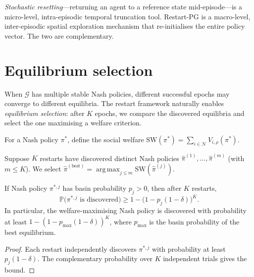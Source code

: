 \documentclass[a4paper,oneside,11pt]{report}
\newcommand{\Prob}{\mathbb{P}}
\newcommand{\calN}{\mathcal{N}}
\newcommand{\calG}{\mathcal{G}}
\DeclareMathOperator*{\argmax}{arg\,max}
\numberwithin{theorem}{chapter}
\numberwithin{equation}{chapter}
\begin{document}
\begin{remark}
  \label{rem:resetting}
  \emph{Stochastic resetting}---returning an agent to a reference state
  mid-episode---is a micro-level, intra-episodic temporal truncation
  tool. Restart-PG is a macro-level, inter-episodic spatial exploration
  mechanism that re-initialises the entire policy vector. The two are
  complementary.
\end{remark}

\section{Equilibrium selection}
\label{sec:eq-selection}

When $\calG$ has multiple stable Nash policies, different successful
epochs may converge to different equilibria. The restart framework
naturally enables \emph{equilibrium selection}: after $K$ epochs, we
compare the discovered equilibria and select the one maximising a
welfare criterion.

\begin{definition}
  For a Nash policy $\pi^*$, define the social welfare
  $\mathrm{SW}(\pi^*) = \sum_{i \in \calN} V_{i,\rho}(\pi^*)$.
\end{definition}

Suppose $K$ restarts have discovered distinct Nash policies
$\hat\pi^{(1)}, \ldots, \hat\pi^{(m)}$ (with $m \le K$). We select
$\hat\pi^{(\text{best})} = \argmax_{j \le m} \mathrm{SW}(\hat\pi^{(j)})$.

\begin{proposition}
  \label{prop:discovery}
  If Nash policy $\pi^{*,j}$ has basin probability $p_j > 0$, then after
  $K$ restarts,
  \begin{equation}
    \Prob\bigl(\pi^{*,j} \text{ is discovered}\bigr)
    \ge 1 - \bigl(1 - p_j(1-\delta)\bigr)^K.
  \end{equation}
  In particular, the welfare-maximising Nash policy is discovered with
  probability at least $1 - (1 - p_{\max}(1-\delta))^K$, where
  $p_{\max}$ is the basin probability of the best equilibrium.
\end{proposition}

\begin{proof}
  Each restart independently discovers $\pi^{*,j}$ with probability at
  least $p_j(1-\delta)$. The complementary probability over $K$
  independent trials gives the bound.
\end{proof}
\end{document}
